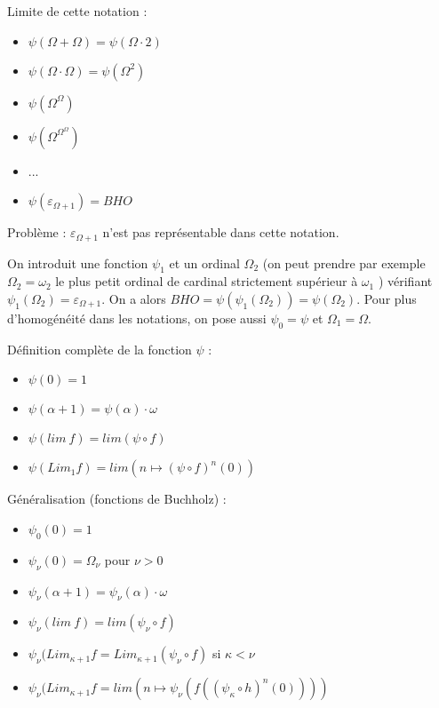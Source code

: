 \documentclass[12pt]{beamer}
\begin{document}
\begin{frame}

Limite de cette notation :

\begin{itemize}
     \setlength{\itemsep}{1pt}
     \setlength{\parskip}{0pt}
     \setlength{\parsep}{0pt}
\item \( \psi(\Omega+\Omega) = \psi(\Omega \cdot 2) \)
\item \( \psi(\Omega \cdot \Omega) = \psi(\Omega^2) \)
\item \( \psi(\Omega^\Omega) \)
\item \( \psi(\Omega^{\Omega^\Omega}) \)
\item ...
\item \( \psi(\varepsilon_{\Omega+1}) = BHO \)
\end{itemize}

Problème : \( \varepsilon_{\Omega+1} \) n'est pas représentable dans cette notation.

On introduit une fonction \( \psi_1 \) et un ordinal \( \Omega_2 \) (on peut prendre par exemple \( \Omega_2 = \omega_2 \) le plus petit ordinal de cardinal strictement supérieur à \( \omega_1 \) ) vérifiant \( \psi_1(\Omega_2) = \varepsilon_{\Omega+1} \). On a alors \( BHO = \psi(\psi_1(\Omega_2)) = \psi(\Omega_2) \). 
Pour plus d'homogénéité dans les notations, on pose aussi \( \psi_0 = \psi \) et \( \Omega_1 = \Omega \).

\end{frame}
\begin{frame}
Définition complète de la fonction \( \psi \) :

\begin{itemize}
     \setlength{\itemsep}{1pt}
     \setlength{\parskip}{0pt}
     \setlength{\parsep}{0pt}
\item \( \psi(0) = 1 \)
\item \( \psi(\alpha+1) = \psi(\alpha) \cdot \omega \)
\item \( \psi(lim\ f) = lim (\psi \circ f) \)
\item \( \psi(Lim_1 f) = lim (n \mapsto (\psi \circ f)^n (0)) \)
\end{itemize}

Généralisation (fonctions de Buchholz) :

\begin{itemize}
     \setlength{\itemsep}{1pt}
     \setlength{\parskip}{0pt}
     \setlength{\parsep}{0pt}
\item \( \psi_0(0) = 1 \)
\item \( \psi_\nu(0) = \Omega_\nu \) pour \( \nu > 0 \)
\item \( \psi_\nu(\alpha+1) = \psi_\nu(\alpha) \cdot \omega \)
\item \( \psi_\nu(lim\ f) = lim (\psi_\nu \circ f) \)
\item \( \psi_\nu(Lim_{\kappa+1}f = Lim_{\kappa+1}(\psi_\nu \circ f) \) si \( \kappa < \nu \)
\item \( \psi_\nu(Lim_{\kappa+1}f = lim (n \mapsto \psi_\nu(f((\psi_\kappa \circ h)^n(0)))) \)
\end{itemize}

\end{frame}
\end{document}
